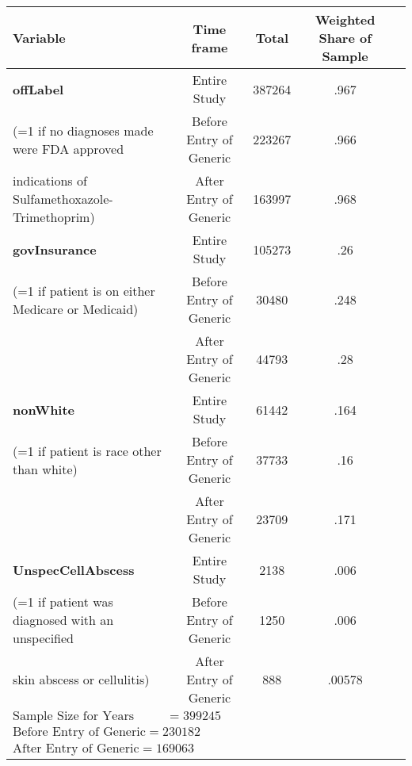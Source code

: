 \begin{tabular}{l*{4}{c}}
\hline\hline
            Variable&\multicolumn{1}{c}{Time frame}&\multicolumn{1}{c}{Total}&\multicolumn{1}{c}{Weighted Share of Sample}\\
\hline
\textbf{offLabel}                                                &     Entire Study&             387264&      .967\\
(=1 if no diagnoses made were FDA approved          &     Before Entry of Generic&    223267&      .966\\
indications of Sulfamethoxazole-Trimethoprim)  &     After Entry of Generic&      163997&      .968\\
[1em]
\textbf{govInsurance}                                            &     Entire Study&             105273&      .26 \\
(=1 if patient is on either Medicare or Medicaid)       &     Before Entry of Generic&     30480 &      .248\\
                                                        &     After Entry of Generic&      44793 &      .28\\
[1em]
\textbf{nonWhite}                                                &     Entire Study&             61442&      .164\\
(=1 if patient is race other than white)                &     Before Entry of Generic&     37733&      .16\\
                                                        &     After Entry of Generic&      23709&      .171\\
[1em]
\textbf{UnspecCellAbscess}                                       &     Entire Study&             2138 &      .006\\
(=1 if patient was diagnosed with an unspecified        &     Before Entry of Generic&     1250 &      .006\\
skin abscess or cellulitis)                            &     After Entry of Generic&      888  &      .00578\\
\hline
$\text{Sample Size for Years 2006-2016} = 399245$\\
$\text{Before Entry of Generic} = 230182$\\
$\text{After Entry of Generic} = 169063$\\
\hline\hline
\end{tabular}

